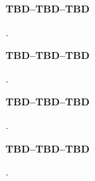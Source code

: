 			\begin{Large}\textbf{TBD--TBD--TBD}\end{Large}.

\secondaryEnd{}

			\begin{Large}\textbf{TBD--TBD--TBD}\end{Large}.

\secondaryEnd{}

			\begin{Large}\textbf{TBD--TBD--TBD}\end{Large}.

\secondaryEnd{}

			\begin{Large}\textbf{TBD--TBD--TBD}\end{Large}.

\secondaryEnd{}
\primaryEnd{}
